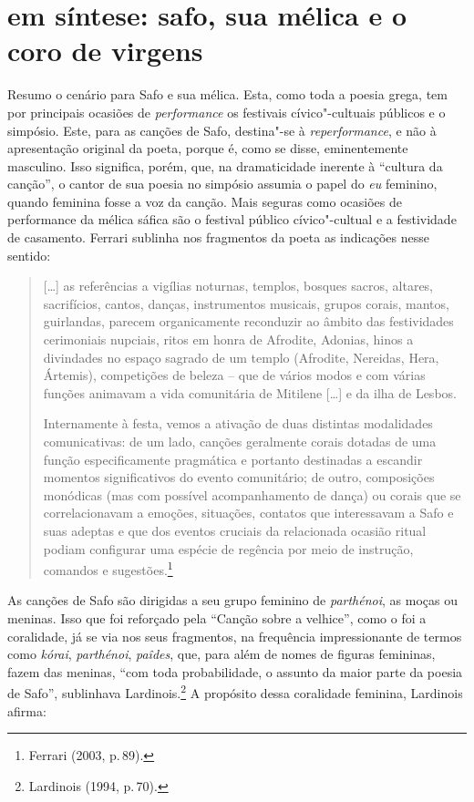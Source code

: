 \section*{em síntese: safo, sua mélica e o coro de virgens}

Resumo o cenário para Safo e sua mélica. Esta, como toda a poesia grega, tem por principais ocasiões de \textit{performance} os festivais cívico"-cultuais públicos e o simpósio. Este, para as canções de Safo, destina"-se à \textit{reperformance}, e não à apresentação original da poeta, porque é, como se disse, eminentemente masculino. Isso significa, porém, que, na dramaticidade inerente à “cultura da canção”, o cantor de sua poesia no simpósio assumia o papel do \textit{eu} feminino, quando feminina fosse a voz da canção. Mais seguras como ocasiões de performance da mélica sáfica são o festival público cívico"-cultual e a festividade de casamento. Ferrari sublinha nos fragmentos da poeta as indicações nesse sentido: 

\begin{quote}
[\ldots{}] as referências a vigílias noturnas, templos, bosques sacros, altares, sacrifícios, cantos, danças, instrumentos musicais, grupos corais, mantos, guirlandas, parecem organicamente reconduzir ao âmbito das festividades cerimoniais nupciais, ritos em honra de Afrodite, Adonias, hinos a divindades no espaço sagrado de um templo (Afrodite, Nereidas, Hera, Ártemis), competições de beleza -- que de vários modos e com várias funções animavam a vida comunitária de Mitilene [\ldots{}] e da ilha de Lesbos.
	
Internamente à festa, vemos a ativação de duas distintas modalidades comunicativas: de um lado, canções geralmente corais dotadas de uma função especificamente pragmática e portanto destinadas a escandir momentos significativos do evento comunitário; de outro, composições monódicas (mas com possível acompanhamento de dança) ou corais que se correlacionavam a emoções, situações, contatos que interessavam a Safo e suas adeptas e que dos eventos cruciais da relacionada ocasião ritual podiam configurar uma espécie de regência por meio de instrução, comandos e sugestões.\footnote{Ferrari (2003, p.\,89).}
\end{quote}

As canções de Safo são dirigidas a seu grupo feminino de \textit{parthénoi}, as moças ou meninas. Isso que foi reforçado pela “Canção sobre a velhice”, como o foi a coralidade, já se via nos seus fragmentos, na frequência impressionante de termos como \textit{kórai}, \textit{parthénoi}, \textit{paîdes}, que, para além de nomes de figuras femininas, fazem das meninas, “com toda probabilidade, o assunto da maior parte da poesia de Safo”, sublinhava Lardinois.\footnote{Lardinois (1994, p.\,70).} A propósito dessa coralidade feminina, Lardinois afirma:

